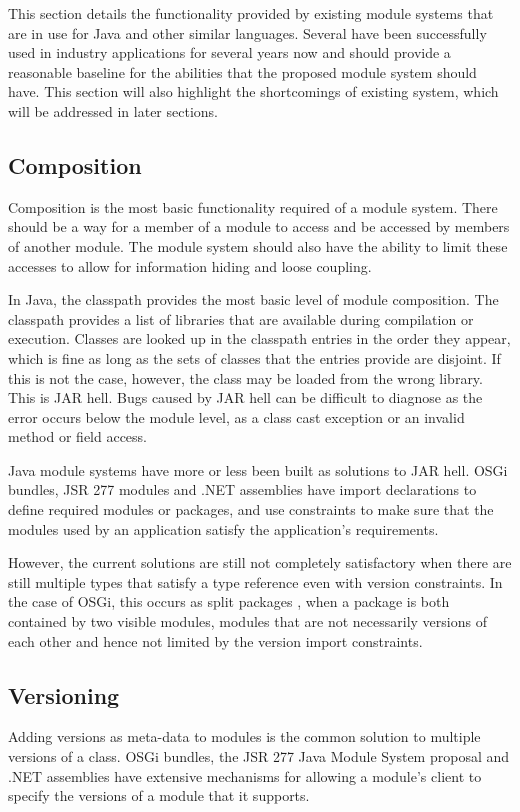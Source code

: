 This section details the functionality provided by existing module systems that
are in use for Java and other similar languages. 
Several \cite{javajars, OSGi4, netassemblies} have been successfully used in industry 
applications for several years now and should provide a reasonable baseline
for the abilities that the proposed module system should have. This section will also
highlight the shortcomings of existing system, which will be addressed in later sections.

\subsection{Composition}

Composition is the most basic functionality required of a module system. There
should be a way for a member of a module to access and be accessed by members of
another module. The module system should also have the ability to limit
these accesses to allow for information hiding and loose coupling.

In Java, the classpath provides the most basic level of module composition. 
The classpath provides a list of libraries that are
available during compilation or execution. Classes are looked up in the 
classpath entries in the order they appear, which is fine as long as the sets 
of classes that the entries provide are disjoint. If this is not the case, however, the class may
be loaded from the wrong library. This is JAR hell. Bugs caused by JAR hell
can be difficult to diagnose as the error occurs below the module level, as 
a class cast exception or an invalid method or field access.

Java module systems have more or less been built as solutions to JAR hell. 
OSGi \cite{OSGi4} bundles, JSR 277 modules \cite{JSR277} and .NET assemblies \cite{netassemblies}
have import declarations to define required modules or packages, and use constraints 
to make sure that the modules used by an application satisfy the 
application's requirements. 

However, the current solutions are still not completely satisfactory when there are still multiple
types that satisfy a type reference even with version constraints. In the case
of OSGi, this occurs as split packages \cite{iJAMComments}, when a package is both contained by
two visible modules, modules that are not necessarily versions of each other
and hence not limited by the version import constraints.

\subsection{Versioning}
Adding versions as meta-data to modules is the common solution to multiple
versions of a class. OSGi bundles, the JSR 277 Java Module System
proposal and .NET assemblies have extensive mechanisms for allowing a 
module's client to specify the versions of a module that it supports.

